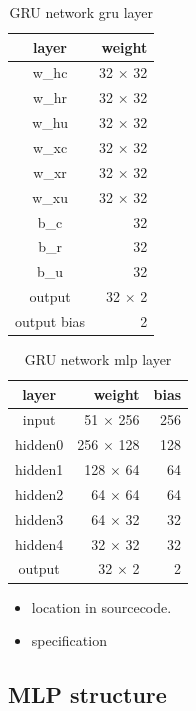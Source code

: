 \begin{table}[H]
\centering
\begin{tabular}{|c|r|}
\hline 
layer  & weight    \\ \hline \hline
w\_hc  & 32 $\times$ 32   \\
w\_hr  & 32 $\times$ 32   \\
w\_hu  & 32 $\times$ 32   \\
w\_xc  & 32 $\times$ 32   \\
w\_xr  & 32 $\times$ 32   \\
w\_xu  & 32 $\times$ 32   \\
b\_c  & 32   \\
b\_r  & 32   \\
b\_u  & 32   \\
output & 32 $\times$ 2   \\
output bias & 2   \\
\hline
\end{tabular} 
\caption{GRU network gru layer}
\label{tab:reward_gru_gru_network}
\end{table}

\begin{table}[H]
\centering
\begin{tabular}{|c|r|r|}
\hline 
layer  & weight   & bias \\ \hline \hline
input  & 51 $\times$ 256 & 256  \\
hidden0 & 256 $\times$ 128 & 128 \\
hidden1 & 128 $\times$ 64  & 64  \\
hidden2 & 64 $\times$ 64   & 64  \\
hidden3 & 64 $\times$ 32   & 32  \\
hidden4 & 32 $\times$ 32   & 32  \\
output & 32 $\times$ 2    & 2  \\
\hline
\end{tabular} 
\caption{GRU network mlp layer}
\label{tab:reward_gru_mlp_network}
\end{table}


\begin{itemize}
\item location in sourcecode.
\item specification
\end{itemize}

\subsection{MLP structure}



